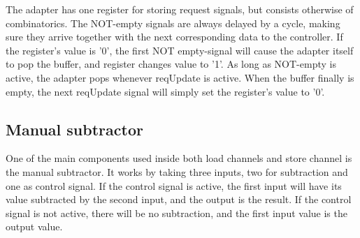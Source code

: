 \begin{appendix}
The adapter has one register for storing request signals, but consists otherwise of combinatorics.
The NOT-empty signals are always delayed by a cycle, making sure they arrive together with the next corresponding data to the controller.
If the register's value is '0', the first NOT empty-signal will cause the adapter itself to pop the buffer, and register changes value to '1'.
As long as NOT-empty is active, the adapter pops whenever reqUpdate is active.
When the buffer finally is empty, the next reqUpdate signal will simply set the register's value to '0'.

\subsection{Manual subtractor}
One of the main components used inside both load channels and store channel is the manual subtractor.
It works by taking three inputs, two for subtraction and one as control signal.
If the control signal is active, the first input will have its value subtracted by the second input, and the output is the result.
If the control signal is not active, there will be no subtraction, and the first input value is the output value. 


\end{appendix}
